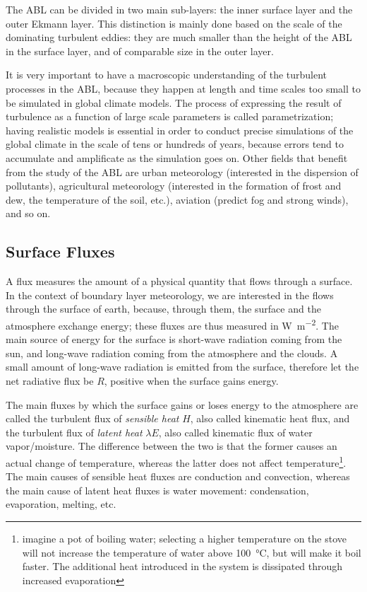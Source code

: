 \documentclass[12pt]{book}
\begin{document}
The ABL can be divided in two main sub-layers: the inner surface layer and the outer Ekmann layer. This distinction is mainly done based on the scale of the dominating turbulent eddies: they are much smaller than the height of the ABL in the surface layer, and of comparable size in the outer layer.

It is very important to have a macroscopic understanding of the turbulent processes in the ABL, because they happen at length and time scales too small to be simulated in global climate models. The process of expressing the result of turbulence as a function of large scale parameters is called parametrization; having realistic models is essential in order to conduct precise simulations of the global climate in the scale of tens or hundreds of years, because errors tend to accumulate and amplificate as the simulation goes on. Other fields that benefit from the study of the ABL are urban meteorology (interested in the dispersion of pollutants), agricultural meteorology (interested in the formation of frost and dew, the temperature of the soil, etc.), aviation (predict fog and strong winds), and so on.

\subsection{Surface Fluxes}
A flux measures the amount of a physical quantity that flows through a surface. In the context of boundary layer meteorology, we are interested in the flows through the surface of earth, because, through them, the surface and the atmosphere exchange energy; these fluxes are thus measured in \si{\watt\per\square\meter}. The main source of energy for the surface is short-wave radiation coming from the sun, and long-wave radiation coming from the atmosphere and the clouds. A small amount of long-wave radiation is emitted from the surface, therefore let the net radiative flux be $R$, positive when the surface gains energy.

The main fluxes by which the surface gains or loses energy to the atmosphere are called the turbulent flux of \emph{sensible heat} $H$, also called kinematic heat flux, and the turbulent flux of \emph{latent heat} $\lambda E$, also called kinematic flux of water vapor/moisture. The difference between the two is that the former causes an actual change of temperature, whereas the latter does not affect temperature\footnote{imagine a pot of boiling water; selecting a higher temperature on the stove will not increase the temperature of water above \SI{100}{\celsius}, but will make it boil faster. The additional heat introduced in the system is dissipated through increased evaporation}. The main causes of sensible heat fluxes are conduction and convection, whereas the main cause of latent heat fluxes is water movement: condensation, evaporation, melting, etc. 
\end{document}
